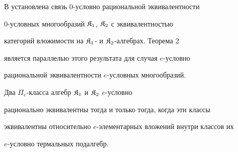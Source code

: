  


В \cite{2} установлена связь $0$-условно рациональной эквивалентности 


$0$-условных многообразий $\frak K_1$, $\frak K_2$ с эквивалентностью 


категорий вложимости на $\frak K_1$- и $\frak K_2$-алгебрах. Теорема 2 


является параллелью этого результата для случая $e$-условно 


рациональной эквивалентности $e$-условных многообразий. 


 


\begin{thm} 


Два $\Pi_e$-класса алгебр $\frak K_1$ и $\frak K_2$\; $e$-условно 


рационально эквивалентны тогда и только тогда, когда эти классы 


эквивалентны относительно $e$-элементарных вложений внутри классов их 


$e$-условно термальных подалгебр. 


\end{thm} 


 


